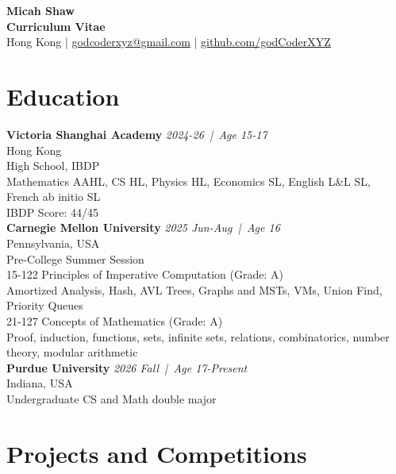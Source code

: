 \documentclass[a4paper,9pt]{extarticle}
\newcommand{\entryheader}[3]{%
    \noindent\textbf{#1} \hfill \textit{#2 \,|\, Age #3}
}
\begin{document}
\pagestyle{empty}

\begin{center}
    \textbf{\Large Micah Shaw }\\[3pt] %
    \textbf{Curriculum Vitae}\\[1pt] %
    Hong Kong | \href{mailto:godcoderxyz@gmail.com}{godcoderxyz@gmail.com} | \href{https://github.com/godCoderXYZ}{github.com/godCoderXYZ}
\end{center}

\section*{Education}
    \noindent
    \entryheader{Victoria Shanghai Academy}{2024-26}{15-17} \\
    Hong Kong \\
    High School, IBDP \\
    Mathematics AAHL, CS HL, Physics HL, Economics SL, English L\&L SL, 
    French ab initio SL\\
    IBDP Score: 44/45\\

    \noindent
    \entryheader{Carnegie Mellon University}{2025 Jun-Aug}{16} \\
    Pennsylvania, USA \\
    Pre-College Summer Session \\
    15-122 Principles of Imperative Computation (Grade: A) \\
    Amortized Analysis, Hash, AVL Trees, Graphs and MSTs, VMs, Union Find, Priority Queues \\
    21-127 Concepts of Mathematics (Grade: A) \\
    Proof, induction, functions, sets, infinite sets, relations, combinatorics, number theory, modular arithmetic \\

    \noindent
    \entryheader{Purdue University}{2026 Fall}{17-Present} \\
    Indiana, USA \\
    Undergraduate CS and Math double major \\

\section*{Projects and Competitions}
\end{document}
